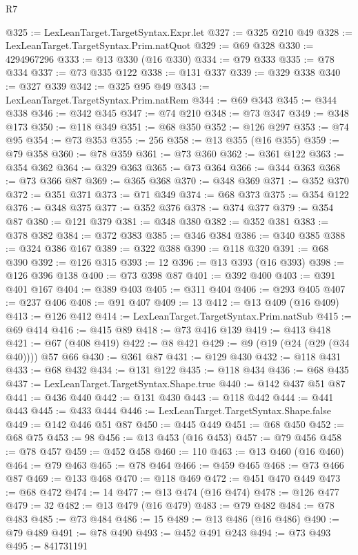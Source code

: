 \begin{lexlean}{R7}
\begin{coremodule}
@325 := LexLeanTarget.TargetSyntax.Expr.let
@327 := @325 @210 @49
@328 := LexLeanTarget.TargetSyntax.Prim.natQuot
@329 := @69 @328
@330 := 4294967296
@333 := @13 @330 (@16 @330)
@334 := @79 @333
@335 := @78 @334
@337 := @73 @335 @122
@338 := @131 @337
@339 := @329 @338
@340 := @327 @339
@342 := @325 @95 @49
@343 := LexLeanTarget.TargetSyntax.Prim.natRem
@344 := @69 @343
@345 := @344 @338
@346 := @342 @345
@347 := @74 @210
@348 := @73 @347
@349 := @348 @173
@350 := @118 @349
@351 := @68 @350
@352 := @126 @297
@353 := @74 @95
@354 := @73 @353
@355 := 256
@358 := @13 @355 (@16 @355)
@359 := @79 @358
@360 := @78 @359
@361 := @73 @360
@362 := @361 @122
@363 := @354 @362
@364 := @329 @363
@365 := @73 @364
@366 := @344 @363
@368 := @73 @366 @87
@369 := @365 @368
@370 := @348 @369
@371 := @352 @370
@372 := @351 @371
@373 := @71 @349
@374 := @68 @373
@375 := @354 @122
@376 := @348 @375
@377 := @352 @376
@378 := @374 @377
@379 := @354 @87
@380 := @121 @379
@381 := @348 @380
@382 := @352 @381
@383 := @378 @382
@384 := @372 @383
@385 := @346 @384
@386 := @340 @385
@388 := @324 @386 @167
@389 := @322 @388
@390 := @118 @320
@391 := @68 @390
@392 := @126 @315
@393 := 12
@396 := @13 @393 (@16 @393)
@398 := @126 @396 @138
@400 := @73 @398 @87
@401 := @392 @400
@403 := @391 @401 @167
@404 := @389 @403
@405 := @311 @404
@406 := @293 @405
@407 := @237 @406
@408 := @91 @407
@409 := 13
@412 := @13 @409 (@16 @409)
@413 := @126 @412
@414 := LexLeanTarget.TargetSyntax.Prim.natSub
@415 := @69 @414
@416 := @415 @89
@418 := @73 @416 @139
@419 := @413 @418
@421 := @67 (@408 @419)
@422 := @8 @421
@429 := @9 (@19 (@24 (@29 (@34 @40)))) @57 @66
@430 := @361 @87
@431 := @129 @430
@432 := @118 @431
@433 := @68 @432
@434 := @131 @122
@435 := @118 @434
@436 := @68 @435
@437 := LexLeanTarget.TargetSyntax.Shape.true
@440 := @142 @437 @51 @87
@441 := @436 @440
@442 := @131 @430
@443 := @118 @442
@444 := @441 @443
@445 := @433 @444
@446 := LexLeanTarget.TargetSyntax.Shape.false
@449 := @142 @446 @51 @87
@450 := @445 @449
@451 := @68 @450
@452 := @68 @75
@453 := 98
@456 := @13 @453 (@16 @453)
@457 := @79 @456
@458 := @78 @457
@459 := @452 @458
@460 := 110
@463 := @13 @460 (@16 @460)
@464 := @79 @463
@465 := @78 @464
@466 := @459 @465
@468 := @73 @466 @87
@469 := @133 @468
@470 := @118 @469
@472 := @451 @470 @449
@473 := @68 @472
@474 := 14
@477 := @13 @474 (@16 @474)
@478 := @126 @477
@479 := 32
@482 := @13 @479 (@16 @479)
@483 := @79 @482
@484 := @78 @483
@485 := @73 @484
@486 := 15
@489 := @13 @486 (@16 @486)
@490 := @79 @489
@491 := @78 @490
@493 := @452 @491 @243
@494 := @73 @493
@495 := 841731191

\end{coremodule}
\end{lexlean}
